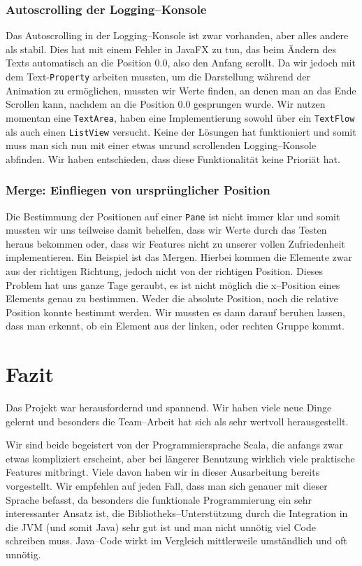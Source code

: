 \subsubsection{Autoscrolling der Logging--Konsole}
Das Autoscrolling in der Logging--Konsole ist zwar vorhanden, aber alles andere als stabil. Dies hat mit einem Fehler in JavaFX zu tun, das beim Ändern des Texts automatisch an die Position 0.0, also den Anfang scrollt. Da wir jedoch mit dem Text-\texttt{Property} arbeiten mussten, um die Darstellung während der Animation zu ermöglichen, mussten wir Werte finden, an denen man an das Ende Scrollen kann, nachdem an die Position 0.0 gesprungen wurde. Wir nutzen momentan eine \texttt{TextArea}, haben eine Implementierung sowohl über ein \texttt{TextFlow} als auch einen \texttt{ListView} versucht. Keine der Lösungen hat funktioniert und somit muss man sich nun mit einer etwas unrund scrollenden Logging--Konsole abfinden. Wir haben entschieden, dass diese Funktionalität keine Prioriät hat.

\subsubsection{Merge: Einfliegen von ursprünglicher Position}
Die Bestimmung der Positionen auf einer \texttt{Pane} ist nicht immer klar und somit mussten wir uns teilweise damit behelfen, dass wir Werte durch das Testen heraus bekommen oder, dass wir Features nicht zu unserer vollen Zufriedenheit implementieren. Ein Beispiel ist das Mergen. Hierbei kommen die Elemente zwar aus der richtigen Richtung, jedoch nicht von der richtigen Position. Dieses Problem hat uns ganze Tage geraubt, es ist nicht möglich die x--Position eines Elements genau zu bestimmen. Weder die absolute Position, noch die relative Position konnte bestimmt werden. Wir mussten es dann darauf beruhen lassen, dass man erkennt, ob ein Element aus der linken, oder rechten Gruppe kommt.

\section{Fazit}\label{sec:fazit}
Das Projekt war herausfordernd und spannend. Wir haben viele neue Dinge gelernt und besonders die Team--Arbeit hat sich als sehr wertvoll herausgestellt.

Wir sind beide begeistert von der Programmiersprache Scala, die anfangs zwar etwas kompliziert erscheint, aber bei längerer Benutzung wirklich viele praktische Features mitbringt. Viele davon haben wir in dieser Ausarbeitung bereits vorgestellt. Wir empfehlen auf jeden Fall, dass man sich genauer mit dieser Sprache befasst, da besonders die funktionale Programmierung ein sehr interessanter Ansatz ist, die Bibliotheks--Unterstützung durch die Integration in die JVM (und somit Java) sehr gut ist und man nicht unnötig viel Code schreiben muss. Java--Code wirkt im Vergleich mittlerweile umständlich und oft unnötig.

